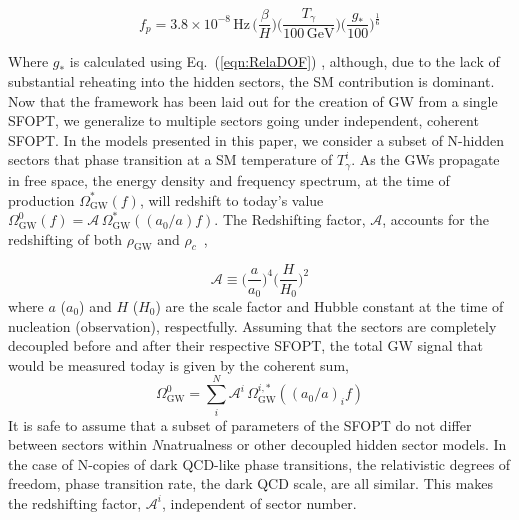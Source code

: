 \documentclass[nofootinbib,twocolumn,preprintnumbers]{revtex4-1}
\begin{document}
\begin{equation}
f_{p} = 3.8 \times 10^{-8} \, \textrm{Hz}\, \bigg( \frac{\beta}{H}\bigg)\bigg(\frac{T_{\gamma}}{100 \, \textrm{GeV}}\bigg)\bigg(\frac{g_{*}}{100}\bigg)^{\frac{1}{6}}
\end{equation}

Where $g_*$  is calculated using Eq.~(\ref{eqn:RelaDOF}) , although, due to the lack of substantial reheating into the hidden sectors, the SM contribution is dominant. Now that the framework has been laid out for the creation of GW from a single SFOPT, we generalize to multiple sectors going under independent, coherent SFOPT. In the models presented in this paper, we consider a subset of N-hidden sectors that phase transition at a SM temperature of $T_{\gamma}^{i}$. As the GWs propagate in free space, the energy density and frequency spectrum, at the time of production $\Omega_{\textrm{GW}}^{*}(f)$, will redshift to today's value $\Omega_{\textrm{GW}}^{0}(f) = \mathcal{A}\, \Omega_{\textrm{GW}}^{*}((a_{0}/a) f) $. The Redshifting factor, $\mathcal{A}$, accounts for the redshifting of both $\rho_{\textrm{GW}} $ and $\rho_{c}$~\cite{Breitbach:2018ddu,PhysRevD.49.2837},

\begin{equation}\label{eqn::redshifting}
\mathcal{A} \equiv \bigg( \frac{a}{a_{0}} \bigg)^4 \bigg( \frac{H}{H_{0}}\bigg)^2
\end{equation}
where $a$ ($a_{0}$)  and $H$ ($H_{0}$) are the scale factor and Hubble constant at the time of nucleation (observation), respectfully. Assuming that the sectors are completely decoupled before and after their respective SFOPT, the total GW signal that would be measured today is given by the coherent sum,
\begin{equation}
\Omega_{\textrm{GW}}^{0} =  \sum_{i}^{N} \mathcal{A}^{i}\, \Omega_{\textrm{GW}}^{i,*}((a_{0}/a)_{i} f) 
\end{equation}
It is safe to assume that a subset of parameters of the SFOPT do not differ between sectors within $N$natrualness or other decoupled hidden sector models. In the case of N-copies of dark QCD-like phase transitions, the relativistic degrees of freedom, phase transition rate,  the dark QCD scale, are all similar. This makes the redshifting factor, $\mathcal{A}^i$, independent of sector number.
\end{document}
